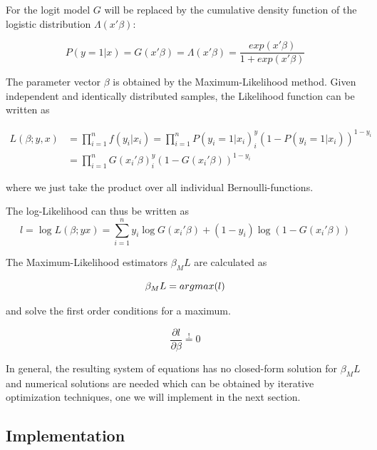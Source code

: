 \documentclass{article}
\begin{document}
For the logit model $G$ will be replaced by the cumulative density function of the logistic distribution $\Lambda(x \prime \beta)$:

\begin{equation}
P(y=1|x) = G(x \prime \beta) = \Lambda(x \prime \beta) = \frac{exp(x \prime \beta)}{1+exp(x \prime \beta)}
\end{equation}

The parameter vector $\beta$ is obtained by the Maximum-Likelihood method. Given independent and identically distributed samples, the Likelihood function can be written as

\begin{equation}
\begin{split}
L(\beta;y, x) &= \prod_{i=1}^{n} f(y_i | x_i)
              =\prod_{i=1}^{n} P(y_i=1|x_i)^y_i\left(1-P(y_i=1|x_i)\right)^{1-y_i} \\
            & =\prod_{i=1}^{n} G(x_i\prime \beta)^y_i\left(1-G(x_i\prime \beta)\right)^{1-y_i}
\end{split}
\end{equation}

where we just take the product over all individual Bernoulli-functions.

The log-Likelihood can thus be written as
\begin{equation}
\label{logL}
l = \log L(\beta;y x) = \sum_{i=1}^{n} y_i \log G(x_i\prime \beta) +(1-y_i) \log (1-G(x_i\prime \beta))
\end{equation}

The Maximum-Likelihood estimators $\beta_ML$ are calculated as

\begin{equation}
\beta_ML = argmax(l) \\
\end{equation}

and solve the first order conditions for a maximum.

\begin{equation}
\frac{\partial l}{\partial \beta} \stackrel{!}{=} 0
\end{equation}

In general, the resulting system of equations has no closed-form solution for $\beta_ML$ and numerical solutions are needed which can be obtained by iterative optimization techniques, one we will implement in the next section.

\subsection{Implementation}
\end{document}
